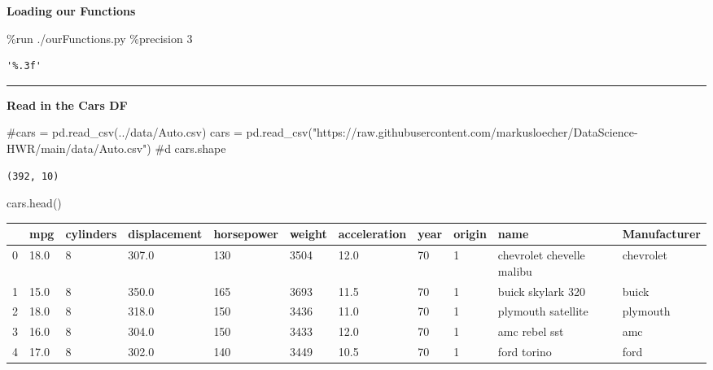 \documentclass[
  letterpaper,
  DIV=11,
  numbers=noendperiod]{scrreprt}
\newenvironment{Shaded}{\begin{snugshade}}{\end{snugshade}}
\newcommand{\CommentTok}[1]{\textcolor[rgb]{0.37,0.37,0.37}{#1}}
\newcommand{\DecValTok}[1]{\textcolor[rgb]{0.68,0.00,0.00}{#1}}
\newcommand{\NormalTok}[1]{\textcolor[rgb]{0.00,0.23,0.31}{#1}}
\newcommand{\OperatorTok}[1]{\textcolor[rgb]{0.37,0.37,0.37}{#1}}
\newcommand{\StringTok}[1]{\textcolor[rgb]{0.13,0.47,0.30}{#1}}
\begin{document}
\textbf{Loading our Functions}

\begin{Shaded}
\begin{Highlighting}[]
\OperatorTok{\%}\NormalTok{run .}\OperatorTok{/}\NormalTok{ourFunctions.py}
\OperatorTok{\%}\NormalTok{precision }\DecValTok{3}
\end{Highlighting}
\end{Shaded}

\begin{verbatim}
'%.3f'
\end{verbatim}

\begin{center}\rule{0.5\linewidth}{0.5pt}\end{center}

\textbf{Read in the Cars DF}

\begin{Shaded}
\begin{Highlighting}[]
\CommentTok{\#cars = pd.read\_csv(\textquotesingle{}../data/Auto.csv\textquotesingle{})}
\NormalTok{cars }\OperatorTok{=}\NormalTok{ pd.read\_csv(}\StringTok{"https://raw.githubusercontent.com/markusloecher/DataScience{-}HWR/main/data/Auto.csv"}\NormalTok{)}
\CommentTok{\#d}
\NormalTok{cars.shape}
\end{Highlighting}
\end{Shaded}

\begin{verbatim}
(392, 10)
\end{verbatim}

\begin{Shaded}
\begin{Highlighting}[]
\NormalTok{cars.head()}
\end{Highlighting}
\end{Shaded}

\begin{longtable}[]{@{}lllllllllll@{}}
\toprule()
& mpg & cylinders & displacement & horsepower & weight & acceleration &
year & origin & name & Manufacturer \\
\midrule()
\endhead
0 & 18.0 & 8 & 307.0 & 130 & 3504 & 12.0 & 70 & 1 & chevrolet chevelle
malibu & chevrolet \\
1 & 15.0 & 8 & 350.0 & 165 & 3693 & 11.5 & 70 & 1 & buick skylark 320 &
buick \\
2 & 18.0 & 8 & 318.0 & 150 & 3436 & 11.0 & 70 & 1 & plymouth satellite &
plymouth \\
3 & 16.0 & 8 & 304.0 & 150 & 3433 & 12.0 & 70 & 1 & amc rebel sst &
amc \\
4 & 17.0 & 8 & 302.0 & 140 & 3449 & 10.5 & 70 & 1 & ford torino &
ford \\
\bottomrule()
\end{longtable}
\end{document}

